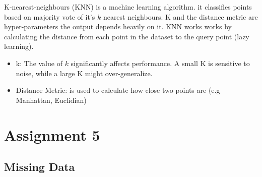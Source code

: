 \documentclass{article}
\begin{document}
K-nearest-neighbours (KNN) is a machine learning algorithm. it classifies points based on majority vote of it's $k$ nearest neighbours. K and the distance metric are hyper-parameters the output depends heavily on it. KNN works works by calculating the distance from each point in the dataset to the query point (lazy learning). \\
\begin{itemize}
    \item k: The value of $k$ significantly affects performance. A small K is sensitive to noise, while a large K might over-generalize.
    \item Distance Metric: is used to calculate how close two points are (e.g Manhattan, Euclidian)
\end{itemize}

\newpage 
\section{Assignment 5}
\subsection{Missing Data}
\end{document}
